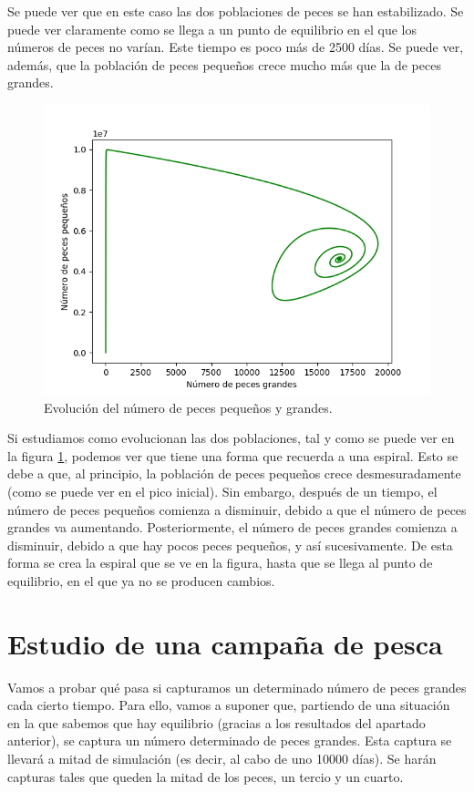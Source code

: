\documentclass[11pt,a4paper]{report}
\begin{document}
Se puede ver que en este caso las dos poblaciones de peces se han estabilizado. Se puede ver claramente como se llega
a un punto de equilibrio en el que los números de peces no varían. Este tiempo es poco más de 2500 días. Se puede ver,
además, que la población de peces pequeños crece mucho más que la de peces grandes.

\begin{figure}[H]
\centering
\includegraphics[scale=0.52]{img/peces-1500-3.png}
\caption{Evolución del número de peces pequeños y grandes.}
\label{fig:peces-peq-grand}
\end{figure}

Si estudiamos como evolucionan las dos poblaciones, tal y como se puede ver en la figura \ref{fig:peces-peq-grand}, podemos
ver que tiene una forma que recuerda a una espiral. Esto se debe a que, al principio, la población de peces pequeños crece
desmesuradamente (como se puede ver en el pico inicial). Sin embargo, después de un tiempo, el número de peces pequeños
comienza a disminuir, debido a que el número de peces grandes va aumentando. Posteriormente, el número de peces grandes
comienza a disminuir, debido a que hay pocos peces pequeños, y así sucesivamente. De esta forma se crea la espiral que
se ve en la figura, hasta que se llega al punto de equilibrio, en el que ya no se producen cambios.

\section{Estudio de una campaña de pesca}

Vamos a probar qué pasa si capturamos un determinado número de peces grandes cada cierto tiempo. Para ello, vamos a suponer
que, partiendo de una situación en la que sabemos que hay equilibrio (gracias a los resultados del apartado anterior), se
captura un número determinado de peces grandes. Esta captura se llevará a mitad de simulación (es decir, al cabo de uno 10000
días). Se harán capturas tales que queden la mitad de los peces, un tercio y un cuarto.
\end{document}
